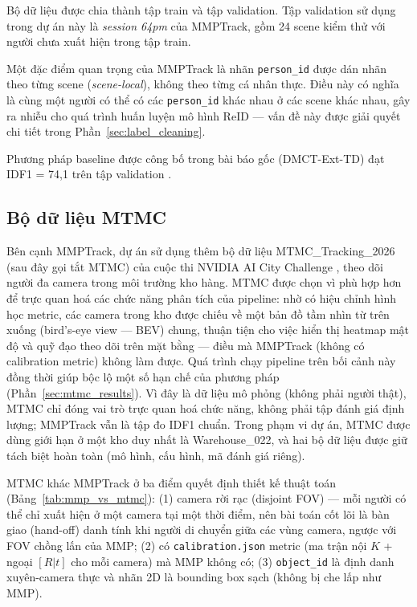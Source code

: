 \documentclass{article} %
\begin{document}
Bộ dữ liệu được chia thành tập train và tập validation. Tập validation sử dụng trong dự án này là \textit{session 64pm} của MMPTrack, gồm 24 scene kiểm thử với người chưa xuất hiện trong tập train.

Một đặc điểm quan trọng của MMPTrack là nhãn \texttt{person\_id} được dán nhãn theo từng scene (\textit{scene-local}), không theo từng cá nhân thực. Điều này có nghĩa là cùng một người có thể có các \texttt{person\_id} khác nhau ở các scene khác nhau, gây ra nhiễu cho quá trình huấn luyện mô hình ReID --- vấn đề này được giải quyết chi tiết trong Phần~\ref{sec:label_cleaning}.

Phương pháp baseline được công bố trong bài báo gốc (DMCT-Ext-TD) đạt IDF1 = 74{,}1 trên tập validation \cite{Han2022}.

\subsection{Bộ dữ liệu MTMC}
\label{sec:mtmc_dataset}

Bên cạnh MMPTrack, dự án sử dụng thêm bộ dữ liệu MTMC\_Tracking\_2026 (sau đây gọi tắt MTMC) của cuộc thi NVIDIA AI City Challenge \cite{Tang25AICity25,Wang24AICity24}, theo dõi người đa camera trong môi trường kho hàng. MTMC được chọn vì phù hợp hơn để trực quan hoá các chức năng phân tích của pipeline: nhờ có hiệu chỉnh hình học metric, các camera trong kho được chiếu về một bản đồ tầm nhìn từ trên xuống (bird's-eye view --- BEV) chung, thuận tiện cho việc hiển thị heatmap mật độ và quỹ đạo theo dõi trên mặt bằng --- điều mà MMPTrack (không có calibration metric) không làm được. Quá trình chạy pipeline trên bối cảnh này đồng thời giúp bộc lộ một số hạn chế của phương pháp (Phần~\ref{sec:mtmc_results}). Vì đây là dữ liệu mô phỏng (không phải người thật), MTMC chỉ đóng vai trò trực quan hoá chức năng, không phải tập đánh giá định lượng; MMPTrack vẫn là tập đo IDF1 chuẩn. Trong phạm vi dự án, MTMC được dùng giới hạn ở một kho duy nhất là Warehouse\_022, và hai bộ dữ liệu được giữ tách biệt hoàn toàn (mô hình, cấu hình, mã đánh giá riêng).

MTMC khác MMPTrack ở ba điểm quyết định thiết kế thuật toán (Bảng~\ref{tab:mmp_vs_mtmc}): (1) camera rời rạc (disjoint FOV) --- mỗi người có thể chỉ xuất hiện ở một camera tại một thời điểm, nên bài toán cốt lõi là bàn giao (hand-off) danh tính khi người di chuyển giữa các vùng camera, ngược với FOV chồng lấn của MMP; (2) có \texttt{calibration.json} metric (ma trận nội $K$ + ngoại $[R|t]$ cho mỗi camera) mà MMP không có; (3) \texttt{object\_id} là định danh xuyên-camera thực và nhãn 2D là bounding box sạch (không bị che lấp như MMP).
\end{document}
